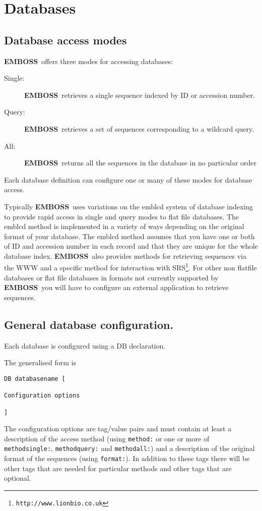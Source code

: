 \documentclass{report}
\newcommand{\ilcomm}[1]{{\tt #1}}
\newcommand{\progname}[1]{{\sc #1}}
\newcommand{\URL}[1]{\footnote{{\tt #1}}}
\newcommand{\EMBOSS}{{\sf\bfseries EMBOSS}}
\begin{document}
\section{Databases}
	\subsection{Database access modes}

\EMBOSS\ offers three modes for accessing databases:
\begin{description}
       \item[Single:]\EMBOSS\ retrieves a single sequence indexed by ID or accession number.
       \item[Query:]\EMBOSS\ retrieves a set of sequences corresponding to a wildcard query.
       \item[All:]\EMBOSS\ returns all the sequences in the database in no particular order
\end{description}

Each database definition can configure one or many of these modes for database access.

Typically \EMBOSS\ uses variations on the \progname{emblcd} system of database indexing to provide rapid access in single and query modes to flat file databases. The \progname{emblcd} method is implemented in a variety of ways depending on the original format of your database.
The \progname{emblcd} method assumes that you have one or both of ID and accession number in each record and that they are unique for the whole database index. 
\EMBOSS\ also provides methods for retrieving sequences via the WWW and a specific method for interaction with SRS\URL{http://www.lionbio.co.uk}.
For other non flatfile databases or flat file databases in formats not currently supported by \EMBOSS\ you will have to configure an external application to retrieve sequences.

\subsection{General database configuration.}

Each database is configured using a DB declaration.

The generalised form is 
\begin{verbatim}
DB databasename [

Configuration options

]
\end{verbatim}

The configuration options are tag/value pairs and must contain at least a description of the access method (using \ilcomm{method:} or one or more of \ilcomm{methodsingle:}, \ilcomm{methodquery:} and \ilcomm{methodall:}) and a description of the original format of the sequences (using \ilcomm{format:}). 
In addition to these tags there will be other tags that are needed for particular methods and other tags that are optional.
\end{document}
